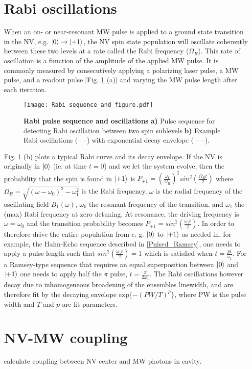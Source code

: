 \section{Rabi oscillations} \label{Rabi}

When an on- or near-resonant MW pulse is applied to a ground state transition in the NV, e.g. $\ket{0} \rightarrow \ket{+1}$, the NV spin state population will oscillate coherently between these two levels at a rate called the Rabi frequency ($\Omega_R$). This rate of oscillation is a function of the amplitude of the applied MW pulse. It is commonly measured by consecutively applying a polarizing laser pulse, a MW pulse, and a readout pulse [Fig. \ref{Fig1_3} (a)] and varying the MW pulse length after each iteration. 

\begin{figure}[t!]
\centering
\texttt{[image: Rabi\_sequence\_and\_figure.pdf]}  
\caption{\textbf{Rabi pulse sequence and oscillations} \textbf{a)} Pulse sequence for detecting Rabi oscillation between two spin sublevels \textbf{b)} Example Rabi oscillations (\textcolor{red}{-- --}) with exponential decay envelope (\textcolor{blue}{ -- --}).}
\label{Fig1_3}
\end{figure}

Fig. \ref{Fig1_3} (b) plots a typical Rabi curve and its decay envelope. If the NV is originally in $\ket{0}$ (ie. at time $t = 0$) and we let the system evolve, then the probability that the spin is found in $\ket{+1}$ is $P_{+1} = \left(\frac{\omega_1}{\Omega_R}\right)^2 sin^2\left(\frac{\Omega_R t}{2}\right)$ where $\Omega_R = \sqrt{(\omega-\omega_0)^2-\omega_1^2}$ is the Rabi frequency, $\omega$ is the radial frequency of the oscillating field $B_1(\omega)$, $\omega_0$ the resonant frequency of the transition, and $\omega_1$ the (max) Rabi frequency at zero detuning. At resonance, the driving frequency is $\omega = \omega_0$ and the transition probability becomes $P_{+1} = sin^2\left(\frac{\omega_1 t}{2}\right)$. In order to therefore drive the entire population from e. g. $\ket{0}$ to $\ket{+1}$ as needed in, for example, the Hahn-Echo sequence described in \ref{Pulsed_Ramsey}, one needs to apply a pulse length such that $sin^2 \left(\frac{\omega_1 t}{2}\right) = 1$ which is satisfied when $t = \frac{pi}{\omega_1}$. For a Ramsey-type sequence that requires an equal superposition between $\ket{0}$ and $\ket{+1}$ one needs to apply half the $\pi$ pulse, $t = \frac{\pi}{2\omega_1}$. The Rabi oscillations however decay due to inhomogeneous broadening of the ensembles linewidth, and are therefore fit by the decaying envelope $\text{exp}\{-\left(PW/T\right)^p\}$, where PW is the pulse width and $T$ and $p$ are fit parameters.

\section{NV-MW coupling}

calculate coupling between NV center and MW photons in cavity.
